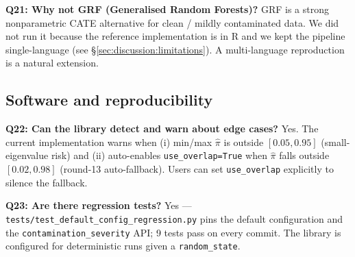 \textbf{Q21: Why not GRF (Generalised Random Forests)?}
GRF is a strong nonparametric CATE alternative for clean / mildly
contaminated data. We did not run it because the reference
implementation is in R and we kept the pipeline single-language
(see \S\ref{sec:discussion:limitations}). A multi-language reproduction
is a natural extension.

\subsection{Software and reproducibility}

\textbf{Q22: Can the library detect and warn about edge cases?}
Yes. The current implementation warns when (i) min/max $\hat\pi$ is
outside $[0.05, 0.95]$ (small-eigenvalue risk) and (ii) auto-enables
\texttt{use\_overlap=True} when $\hat\pi$ falls outside
$[0.02, 0.98]$ (round-13 auto-fallback). Users can set
\texttt{use\_overlap} explicitly to silence the fallback.

\textbf{Q23: Are there regression tests?}
Yes --- \texttt{tests/test\_default\_config\_regression.py} pins the
default configuration and the \texttt{contamination\_severity} API; 9 tests
pass on every commit. The library is configured for deterministic
runs given a \texttt{random\_state}.
